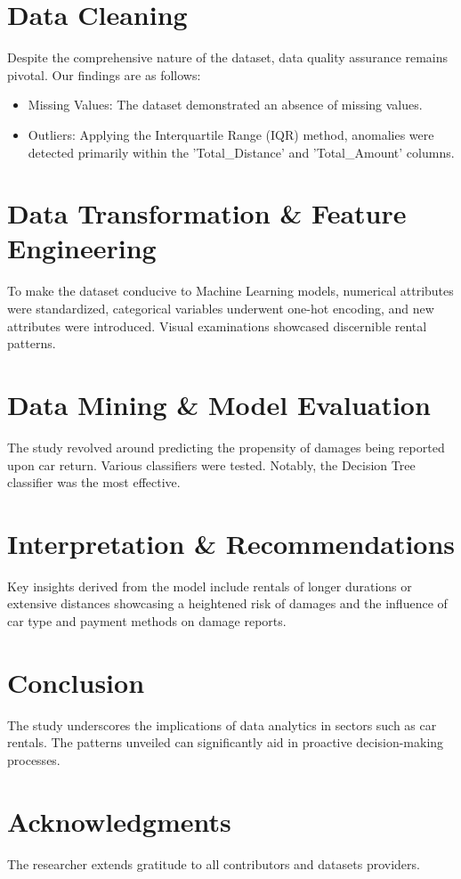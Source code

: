 \documentclass{article}
\begin{document}
\section{Data Cleaning}
Despite the comprehensive nature of the dataset, data quality assurance remains pivotal. Our findings are as follows:
\begin{itemize}
    \item Missing Values: The dataset demonstrated an absence of missing values.
    \item Outliers: Applying the Interquartile Range (IQR) method, anomalies were detected primarily within the 'Total\_Distance' and 'Total\_Amount' columns.
\end{itemize}

\section{Data Transformation \& Feature Engineering}
To make the dataset conducive to Machine Learning models, numerical attributes were standardized, categorical variables underwent one-hot encoding, and new attributes were introduced. Visual examinations showcased discernible rental patterns.

\section{Data Mining \& Model Evaluation}
The study revolved around predicting the propensity of damages being reported upon car return. Various classifiers were tested. Notably, the Decision Tree classifier was the most effective.

\section{Interpretation \& Recommendations}
Key insights derived from the model include rentals of longer durations or extensive distances showcasing a heightened risk of damages and the influence of car type and payment methods on damage reports.

\section{Conclusion}
The study underscores the implications of data analytics in sectors such as car rentals. The patterns unveiled can significantly aid in proactive decision-making processes.

\section{Acknowledgments}
The researcher extends gratitude to all contributors and datasets providers.
\end{document}
